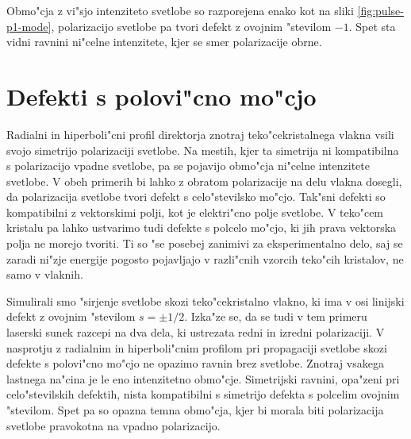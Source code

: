 \documentclass[12pt,twoside,openright,final]{report}
\begin{document}
Obmo"cja z vi"sjo intenziteto svetlobe so razporejena enako kot na sliki \ref{fig:pulse-p1-mode}, polarizacijo svetlobe pa tvori defekt z ovojnim "stevilom $-1$. 
Spet sta vidni ravnini ni"celne intenzitete, kjer se smer polarizacije obrne. 

\section{Defekti s polovi"cno mo"cjo}

Radialni in hiperboli"cni profil direktorja znotraj teko"cekristalnega vlakna vsili svojo simetrijo polarizaciji svetlobe. 
Na mestih, kjer ta simetrija ni kompatibilna s polarizacijo vpadne svetlobe, pa se pojavijo obmo"cja ni"celne intenzitete svetlobe. 
V obeh primerih bi lahko z obratom polarizacije na delu vlakna dosegli, da polarizacija svetlobe tvori defekt s celo"stevilsko mo"cjo. 
Tak"sni defekti so kompatibilni z vektorskimi polji, kot je elektri"cno polje svetlobe. 
V teko"cem kristalu pa lahko ustvarimo tudi defekte s polcelo mo"cjo, ki jih prava vektorska polja ne morejo tvoriti. 
Ti so "se posebej zanimivi za eksperimentalno delo, saj se zaradi ni"zje energije pogosto pojavljajo v razli"cnih vzorcih teko"cih kristalov, ne samo v vlaknih. 

Simulirali smo "sirjenje svetlobe skozi teko"cekristalno vlakno, ki ima v osi linijski defekt z ovojnim "stevilom $s =\pm 1/2$. 
Izka"ze se, da se tudi v tem primeru laserski sunek razcepi na dva dela, ki ustrezata redni in izredni polarizaciji. 
V nasprotju z radialnim in hiperboli"cnim profilom pri propagaciji svetlobe skozi defekte s polovi"cno mo"cjo ne opazimo ravnin brez svetlobe. 
Znotraj vsakega lastnega na"cina je le eno intenzitetno obmo"cje. 
Simetrijski ravnini, opa"zeni pri celo"stevilskih defektih, nista kompatibilni s simetrijo defekta s polcelim ovojnim "stevilom. 
Spet pa so opazna temna obmo"cja, kjer bi morala biti polarizacija svetlobe pravokotna na vpadno polarizacijo. 
\end{document}
